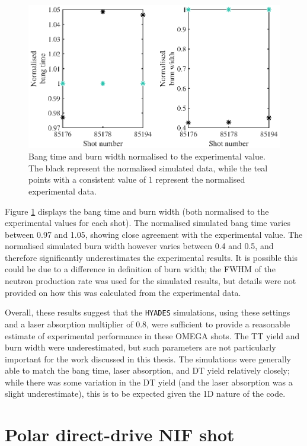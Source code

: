 \begin{figure}[ht]
\centering
\includegraphics{figures/LowCR/BenchmarkOmegaBT.eps}
\caption{Bang time and burn width normalised to the experimental value. The black represent the normalised simulated data, while the teal points with a consistent value of 1 represent the normalised experimental data.}
\label{fig:OmegaBT}
\end{figure}


Figure \ref{fig:OmegaBT} displays the bang time and burn width (both normalised to the experimental values for each shot). The normalised simulated bang time varies between 0.97 and 1.05, showing close agreement with the experimental value. The normalised simulated burn width however varies between 0.4 and 0.5, and therefore significantly underestimates the experimental results. It is possible this could be due to a difference in definition of burn width; the FWHM of the neutron production rate was used for the simulated results, but details were not provided on how this was calculated from the experimental data.

Overall, these results suggest that the \texttt{HYADES} simulations, using these settings and a laser absorption multiplier of 0.8, were sufficient to provide a reasonable estimate of experimental performance in these OMEGA shots. The TT yield and burn width were underestimated, but such parameters are not particularly important for the work discussed in this thesis. The simulations were generally able to match the bang time, laser absorption, and DT yield relatively closely; while there was some variation in the DT yield (and the laser absorption was a slight underestimate), this is to be expected given the 1D nature of the code.

\section{Polar direct-drive NIF shot}

